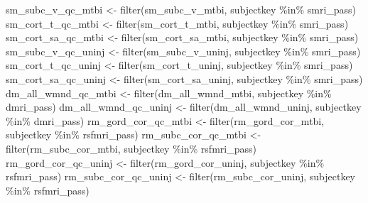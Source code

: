 \documentclass[
  letterpaper,
  DIV=11,
  numbers=noendperiod]{scrreprt}
\newenvironment{Shaded}{\begin{snugshade}}{\end{snugshade}}
\newcommand{\FunctionTok}[1]{\textcolor[rgb]{0.28,0.35,0.67}{#1}}
\newcommand{\NormalTok}[1]{\textcolor[rgb]{0.00,0.23,0.31}{#1}}
\newcommand{\OtherTok}[1]{\textcolor[rgb]{0.00,0.23,0.31}{#1}}
\newcommand{\SpecialCharTok}[1]{\textcolor[rgb]{0.37,0.37,0.37}{#1}}
\begin{document}
\begin{Shaded}
\begin{Highlighting}[]
\NormalTok{sm\_subc\_v\_qc\_mtbi }\OtherTok{\textless{}{-}} \FunctionTok{filter}\NormalTok{(sm\_subc\_v\_mtbi, subjectkey }\SpecialCharTok{\%in\%}\NormalTok{ smri\_pass)}
\NormalTok{sm\_cort\_t\_qc\_mtbi }\OtherTok{\textless{}{-}} \FunctionTok{filter}\NormalTok{(sm\_cort\_t\_mtbi, subjectkey }\SpecialCharTok{\%in\%}\NormalTok{ smri\_pass)}
\NormalTok{sm\_cort\_sa\_qc\_mtbi }\OtherTok{\textless{}{-}} \FunctionTok{filter}\NormalTok{(sm\_cort\_sa\_mtbi, subjectkey }\SpecialCharTok{\%in\%}\NormalTok{ smri\_pass)}
\NormalTok{sm\_subc\_v\_qc\_uninj }\OtherTok{\textless{}{-}} \FunctionTok{filter}\NormalTok{(sm\_subc\_v\_uninj, subjectkey }\SpecialCharTok{\%in\%}\NormalTok{ smri\_pass)}
\NormalTok{sm\_cort\_t\_qc\_uninj }\OtherTok{\textless{}{-}} \FunctionTok{filter}\NormalTok{(sm\_cort\_t\_uninj, subjectkey }\SpecialCharTok{\%in\%}\NormalTok{ smri\_pass)}
\NormalTok{sm\_cort\_sa\_qc\_uninj }\OtherTok{\textless{}{-}} \FunctionTok{filter}\NormalTok{(sm\_cort\_sa\_uninj, subjectkey }\SpecialCharTok{\%in\%}\NormalTok{ smri\_pass)}
\NormalTok{dm\_all\_wmnd\_qc\_mtbi }\OtherTok{\textless{}{-}} \FunctionTok{filter}\NormalTok{(dm\_all\_wmnd\_mtbi, subjectkey }\SpecialCharTok{\%in\%}\NormalTok{ dmri\_pass)}
\NormalTok{dm\_all\_wmnd\_qc\_uninj }\OtherTok{\textless{}{-}} \FunctionTok{filter}\NormalTok{(dm\_all\_wmnd\_uninj, subjectkey }\SpecialCharTok{\%in\%}\NormalTok{ dmri\_pass)}
\NormalTok{rm\_gord\_cor\_qc\_mtbi }\OtherTok{\textless{}{-}} \FunctionTok{filter}\NormalTok{(rm\_gord\_cor\_mtbi, subjectkey }\SpecialCharTok{\%in\%}\NormalTok{ rsfmri\_pass)}
\NormalTok{rm\_subc\_cor\_qc\_mtbi }\OtherTok{\textless{}{-}} \FunctionTok{filter}\NormalTok{(rm\_subc\_cor\_mtbi, subjectkey }\SpecialCharTok{\%in\%}\NormalTok{ rsfmri\_pass)}
\NormalTok{rm\_gord\_cor\_qc\_uninj }\OtherTok{\textless{}{-}} \FunctionTok{filter}\NormalTok{(rm\_gord\_cor\_uninj, subjectkey }\SpecialCharTok{\%in\%}\NormalTok{ rsfmri\_pass)}
\NormalTok{rm\_subc\_cor\_qc\_uninj }\OtherTok{\textless{}{-}} \FunctionTok{filter}\NormalTok{(rm\_subc\_cor\_uninj, subjectkey }\SpecialCharTok{\%in\%}\NormalTok{ rsfmri\_pass)}


\end{Highlighting}
\end{Shaded}
\end{document}
